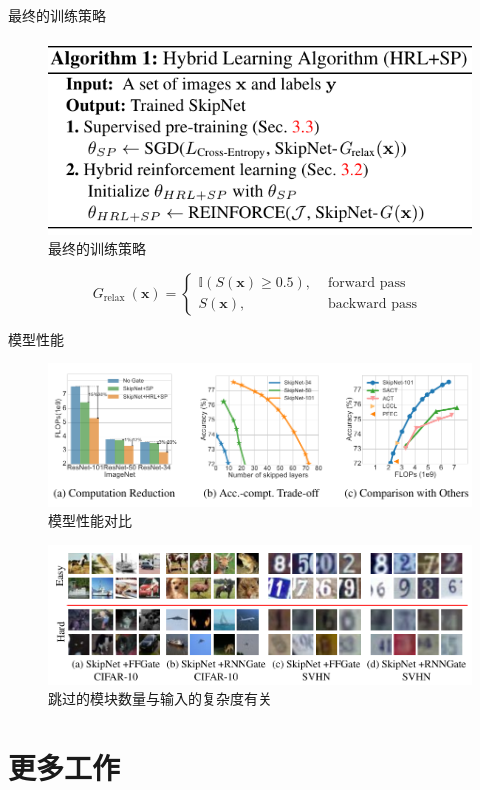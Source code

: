 \documentclass[UTF8, fontset=founder, aspectratio=43, 10pt, t]{ctexbeamer}
\begin{document}
\begin{frame}{最终的训练策略}
	\begin{figure}
		\centering
		\includegraphics[width=0.7\linewidth]{Images/hrl}
		\caption{最终的训练策略}
		\label{fig:hrl}
	\end{figure}
	$$
	G_{\text {relax }}(\mathbf{x})=\left\{\begin{aligned} \mathbb{I}(S(\mathbf{x}) \geq 0.5), & \text { forward pass } \\ S(\mathbf{x}), & \text { backward pass } \end{aligned}\right.
	$$
\end{frame}

\begin{frame}{模型性能}
	\begin{figure}
		\centering
		\includegraphics[width=0.7\linewidth]{Images/res}
		\caption{模型性能对比}
		\label{fig:res}
	\end{figure}
	\begin{figure}
		\centering
		\includegraphics[width=0.7\linewidth]{Images/difficult}
		\caption{跳过的模块数量与输入的复杂度有关}
		\label{fig:difficult}
	\end{figure}
	
\end{frame}

\section{更多工作}
\end{document}
